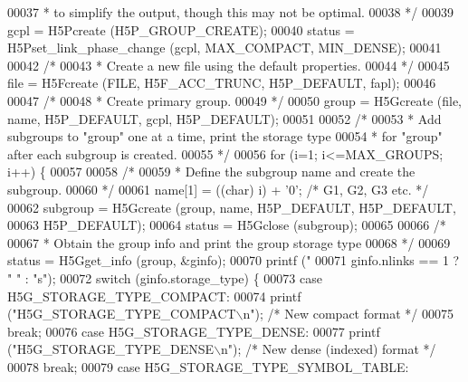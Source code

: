 \begin{DoxyCode}
00037 \textcolor{comment}{     * to simplify the output, though this may not be optimal.}
00038 \textcolor{comment}{     */}
00039     gcpl = H5Pcreate (H5P\_GROUP\_CREATE);
00040     status = H5Pset\_link\_phase\_change (gcpl, MAX\_COMPACT, MIN\_DENSE);
00041 
00042     \textcolor{comment}{/*}
00043 \textcolor{comment}{     * Create a new file using the default properties.}
00044 \textcolor{comment}{     */}
00045     file = H5Fcreate (FILE, H5F\_ACC\_TRUNC, H5P\_DEFAULT, fapl);
00046 
00047     \textcolor{comment}{/*}
00048 \textcolor{comment}{     * Create primary group.}
00049 \textcolor{comment}{     */}
00050     group = H5Gcreate (file, name, H5P\_DEFAULT, gcpl, H5P\_DEFAULT);
00051 
00052     \textcolor{comment}{/*}
00053 \textcolor{comment}{     * Add subgroups to "group" one at a time, print the storage type}
00054 \textcolor{comment}{     * for "group" after each subgroup is created.}
00055 \textcolor{comment}{     */}
00056     \textcolor{keywordflow}{for} (i=1; i<=MAX\_GROUPS; i++) \{
00057 
00058         \textcolor{comment}{/*}
00059 \textcolor{comment}{         * Define the subgroup name and create the subgroup.}
00060 \textcolor{comment}{         */}
00061         name[1] = ((char) i) + \textcolor{charliteral}{'0'};     \textcolor{comment}{/* G1, G2, G3 etc. */}
00062         subgroup = H5Gcreate (group, name, H5P\_DEFAULT, H5P\_DEFAULT,
00063                     H5P\_DEFAULT);
00064         status = H5Gclose (subgroup);
00065 
00066         \textcolor{comment}{/*}
00067 \textcolor{comment}{         * Obtain the group info and print the group storage type}
00068 \textcolor{comment}{         */}
00069         status = H5Gget\_info (group, &ginfo);
00070         printf (\textcolor{stringliteral}{"%
00071                     ginfo.nlinks == 1 ? \textcolor{stringliteral}{" "} : \textcolor{stringliteral}{"s"});
00072         \textcolor{keywordflow}{switch} (ginfo.storage\_type) \{
00073             \textcolor{keywordflow}{case} H5G\_STORAGE\_TYPE\_COMPACT:
00074                 printf (\textcolor{stringliteral}{"H5G\_STORAGE\_TYPE\_COMPACT\(\backslash\)n"}); \textcolor{comment}{/* New compact format */}
00075                 \textcolor{keywordflow}{break};
00076             \textcolor{keywordflow}{case} H5G\_STORAGE\_TYPE\_DENSE:
00077                 printf (\textcolor{stringliteral}{"H5G\_STORAGE\_TYPE\_DENSE\(\backslash\)n"}); \textcolor{comment}{/* New dense (indexed) format */}
00078                 \textcolor{keywordflow}{break};
00079             \textcolor{keywordflow}{case} H5G\_STORAGE\_TYPE\_SYMBOL\_TABLE:
}
\end{DoxyCode}
